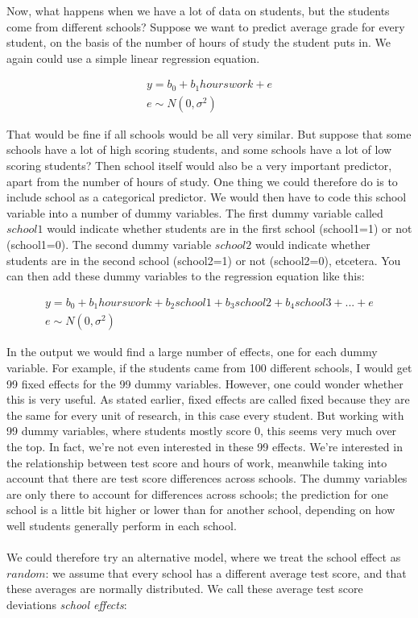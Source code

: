 \documentclass[]{report}\usepackage[]{graphicx}\usepackage[]{color}
\begin{document}
Now, what happens when we have a lot of data on students, but the students come from different schools? Suppose we want to predict average grade for every student, on the basis of the number of hours of study the student puts in. We again could use a simple linear regression equation. 

\begin{eqnarray}
y = b_0 + b_1 hourswork + e \\
e \sim N(0, \sigma^2)
\end{eqnarray}



That would be fine if all schools would be all very similar. But suppose that some schools have a lot of high scoring students, and some schools have a lot of low scoring students? Then school itself would also be a very important predictor, apart from the number of hours of study. One thing we could therefore do is to include school as a categorical predictor. We would then have to code this school variable into a number of dummy variables. The first dummy variable called $school1$ would indicate whether students are in the first school (school1=1) or not (school1=0). The second dummy variable $school2$ would indicate whether students are in the second school (school2=1) or not (school2=0), etcetera. You can then add these dummy variables to the regression equation like this:

\begin{eqnarray}
y = b_0 + b_1 hourswork + b_2 school1 + b_3 school2 + b_4 school3 + ... + e  \nonumber\\
e \sim N(0, \sigma^2)  \nonumber
\end{eqnarray}

In the output we would find a large number of effects, one for each dummy variable. For example, if the students came from 100 different schools, I would get 99 fixed effects for the 99 dummy variables. However, one could wonder whether this is very useful. As stated earlier, fixed effects are called fixed because they are the same for every unit of research, in this case every student. But working with 99 dummy variables, where students mostly score 0, this seems very much over the top. In fact, we're not even interested in these 99 effects. We're interested in the relationship between test score and hours of work, meanwhile taking into account that there are test score differences across schools. The dummy variables are only there to account for differences across schools; the prediction for one school is a little bit higher or lower than for another school, depending on how well students generally perform in each school. 
\\
\\
We could therefore try an alternative model, where we treat the school effect as $random$: we assume that every school has a different average test score, and that these averages are normally distributed. We call these average test score deviations \textit{school effects}:
\end{document}
